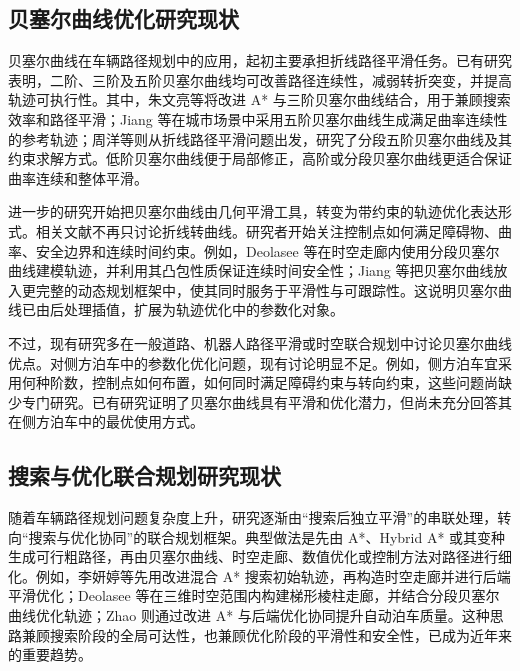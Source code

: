 \subsection{贝塞尔曲线优化研究现状}

贝塞尔曲线在车辆路径规划中的应用，起初主要承担折线路径平滑任务。已有研究表明，二阶、三阶及五阶贝塞尔曲线均可改善路径连续性，减弱转折突变，并提高轨迹可执行性\cite{zhu2025astarbezier,jiang2019dynamicmotionplanningurban,zhou2025quinticbezier}。其中，朱文亮等将改进 A* 与三阶贝塞尔曲线结合，用于兼顾搜索效率和路径平滑；Jiang 等在城市场景中采用五阶贝塞尔曲线生成满足曲率连续性的参考轨迹；周洋等则从折线路径平滑问题出发，研究了分段五阶贝塞尔曲线及其约束求解方式\cite{zhu2025astarbezier,jiang2019dynamicmotionplanningurban,zhou2025quinticbezier}。低阶贝塞尔曲线便于局部修正，高阶或分段贝塞尔曲线更适合保证曲率连续和整体平滑。

进一步的研究开始把贝塞尔曲线由几何平滑工具，转变为带约束的轨迹优化表达形式。相关文献不再只讨论折线转曲线。研究者开始关注控制点如何满足障碍物、曲率、安全边界和连续时间约束\cite{zhou2025quinticbezier,deolasee2022spatiotemporalbezier,jiang2019dynamicmotionplanningurban}。例如，Deolasee 等在时空走廊内使用分段贝塞尔曲线建模轨迹，并利用其凸包性质保证连续时间安全性；Jiang 等把贝塞尔曲线放入更完整的动态规划框架中，使其同时服务于平滑性与可跟踪性\cite{deolasee2022spatiotemporalbezier,jiang2019dynamicmotionplanningurban}。这说明贝塞尔曲线已由后处理插值，扩展为轨迹优化中的参数化对象。

不过，现有研究多在一般道路、机器人路径平滑或时空联合规划中讨论贝塞尔曲线优点\cite{zhu2025astarbezier,zhou2025quinticbezier,deolasee2022spatiotemporalbezier}。对侧方泊车中的参数化优化问题，现有讨论明显不足。例如，侧方泊车宜采用何种阶数，控制点如何布置，如何同时满足障碍约束与转向约束，这些问题尚缺少专门研究。已有研究证明了贝塞尔曲线具有平滑和优化潜力，但尚未充分回答其在侧方泊车中的最优使用方式。

\subsection{搜索与优化联合规划研究现状}

随着车辆路径规划问题复杂度上升，研究逐渐由“搜索后独立平滑”的串联处理，转向“搜索与优化协同”的联合规划框架。典型做法是先由 A*、Hybrid A* 或其变种生成可行粗路径，再由贝塞尔曲线、时空走廊、数值优化或控制方法对路径进行细化\cite{yin2025avp,li2025hybridastarjoint,deolasee2022spatiotemporalbezier,zhao2024automatedparkingbev}。例如，李妍婷等先用改进混合 A* 搜索初始轨迹，再构造时空走廊并进行后端平滑优化；Deolasee 等在三维时空范围内构建梯形棱柱走廊，并结合分段贝塞尔曲线优化轨迹；Zhao 则通过改进 A* 与后端优化协同提升自动泊车质量\cite{li2025hybridastarjoint,deolasee2022spatiotemporalbezier,zhao2024automatedparkingbev}。这种思路兼顾搜索阶段的全局可达性，也兼顾优化阶段的平滑性和安全性，已成为近年来的重要趋势。

